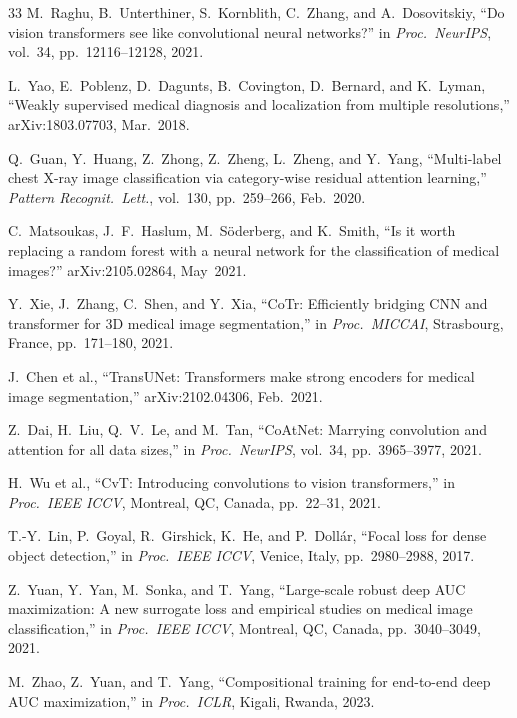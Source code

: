 \documentclass[conference]{IEEEtran}
\begin{document}
\begin{thebibliography}{33}
M.~Raghu, B.~Unterthiner, S.~Kornblith, C.~Zhang, and A.~Dosovitskiy,
``Do vision transformers see like convolutional neural networks?''
in \textit{Proc.\ NeurIPS}, vol.~34, pp.~12116--12128, 2021.

L.~Yao, E.~Poblenz, D.~Dagunts, B.~Covington, D.~Bernard, and
K.~Lyman, ``Weakly supervised medical diagnosis and localization from
multiple resolutions,'' arXiv:1803.07703, Mar.~2018.

Q.~Guan, Y.~Huang, Z.~Zhong, Z.~Zheng, L.~Zheng, and Y.~Yang,
``Multi-label chest X-ray image classification via category-wise
residual attention learning,''
\textit{Pattern Recognit.\ Lett.}, vol.~130, pp.~259--266, Feb.~2020.

C.~Matsoukas, J.~F.~Haslum, M.~S\"{o}derberg, and K.~Smith,
``Is it worth replacing a random forest with a neural network for the
classification of medical images?'' arXiv:2105.02864, May~2021.

Y.~Xie, J.~Zhang, C.~Shen, and Y.~Xia, ``CoTr: Efficiently bridging
CNN and transformer for 3D medical image segmentation,''
in \textit{Proc.\ MICCAI}, Strasbourg, France,
pp.~171--180, 2021.

J.~Chen et al., ``TransUNet: Transformers make strong encoders for
medical image segmentation,'' arXiv:2102.04306, Feb.~2021.

Z.~Dai, H.~Liu, Q.~V.~Le, and M.~Tan, ``CoAtNet: Marrying convolution
and attention for all data sizes,''
in \textit{Proc.\ NeurIPS}, vol.~34, pp.~3965--3977, 2021.

H.~Wu et al., ``CvT: Introducing convolutions to vision transformers,''
in \textit{Proc.\ IEEE ICCV}, Montreal, QC, Canada,
pp.~22--31, 2021.

T.-Y.~Lin, P.~Goyal, R.~Girshick, K.~He, and P.~Doll\'{a}r,
``Focal loss for dense object detection,''
in \textit{Proc.\ IEEE ICCV}, Venice, Italy,
pp.~2980--2988, 2017.

Z.~Yuan, Y.~Yan, M.~Sonka, and T.~Yang,
``Large-scale robust deep AUC maximization: A new surrogate loss and
empirical studies on medical image classification,''
in \textit{Proc.\ IEEE ICCV}, Montreal, QC, Canada,
pp.~3040--3049, 2021.

M.~Zhao, Z.~Yuan, and T.~Yang, ``Compositional training for end-to-end
deep AUC maximization,''
in \textit{Proc.\ ICLR}, Kigali, Rwanda, 2023.


\end{thebibliography}
\end{document}
